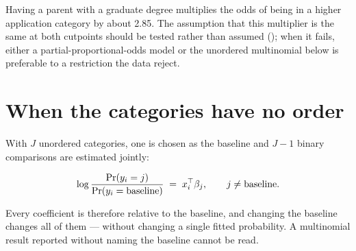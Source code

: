 \documentclass[
  letterpaper,
  10pt,
  twoside,
  openright,
  numbers=noenddot,
  chapterprefix=true]{scrbook}
\begin{document}
Having a parent with a graduate degree multiplies the odds of being in a
higher application category by about 2.85. The assumption that this
multiplier is the same at both cutpoints should be tested rather than
assumed (); when it fails, either a
partial-proportional-odds model or the unordered multinomial below is
preferable to a restriction the data reject.

\section{When the categories have no
order}\label{when-the-categories-have-no-order}

With \(J\) unordered categories, one is chosen as the baseline and
\(J-1\) binary comparisons are estimated jointly:

\[
\log \frac{\Pr(y_i = j)}{\Pr(y_i = \text{baseline})} \thickspace=\thickspace x_i^\top\beta_j ,
\qquad j \ne \text{baseline}.
\]

Every coefficient is therefore relative to the baseline, and changing
the baseline changes all of them --- without changing a single fitted
probability. A multinomial result reported without naming the baseline
cannot be read.
\end{document}
